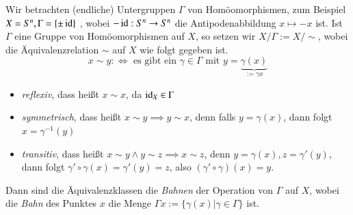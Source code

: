 \documentclass[a4paper,10pt]{scrartcl}
\begin{document}
Wir betrachten (endliche) Untergruppen $\Gamma$ von Homöomorphismen, zum Beispiel $X=S^n, \Gamma=\{\pm \operatorname{id}\}$ , wobei $- \operatorname{id}: S^n\to S^n$ die Antipodenabbildung $x\mapsto -x$ ist. Ist $\Gamma$ eine Gruppe von Homöomorphismen auf $X$, so setzen wir $X/\Gamma:=X/\sim$, wobei die Äquivalenzrelation $\sim$ auf $X$ wie folgt gegeben ist.
\[
 x\sim y :\iff \text{ es gibt ein } \gamma\in \Gamma \text{ mit } y=\underbrace{\gamma(x)}_{:=\gamma x}
\]
\begin{itemize}
\item \emph{reflexiv}, dass heißt $x\sim x$, da $\operatorname{id}_X\in \Gamma$
\item \emph{symmetrisch}, dass heißt $x\sim y \implies y\sim x$, denn falls $y=\gamma(x)$, dann folgt $x=\gamma^{-1}(y)$
\item \emph{transitiv}, dass heißt $x\sim y \land y\sim z \implies x\sim z$, denn $y=\gamma(x), z=\gamma'(y)$, dann folgt $\gamma'\circ \gamma(x)=\gamma' (y)=z$, also $(\gamma'\circ \gamma)(x)=y$. 
\end{itemize}
Dann sind die Äquivalenzklassen die \emph{Bahnen} der Operation von $\Gamma$ auf $X$, wobei die \emph{Bahn} des Punktes $x$ die Menge $\Gamma x:=\{\gamma(x) | \gamma \in \Gamma\}$ ist.
\end{document}
